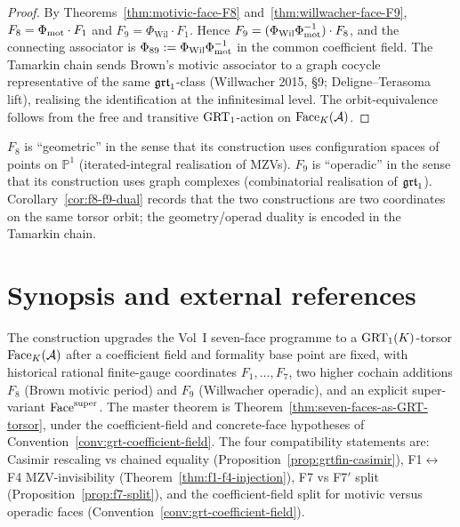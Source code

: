 \begin{proof}
By Theorems~\ref{thm:motivic-face-F8} and~\ref{thm:willwacher-face-F9},
$F_8 = \Phi_{\mathrm{mot}}\cdot F_1$ and $F_9 = \Phi_{\mathrm{Wil}}\cdot F_1$.
Hence
$F_9 = (\Phi_{\mathrm{Wil}}\Phi_{\mathrm{mot}}^{-1})\cdot F_8$, and the
connecting associator is
$\Phi_{89} := \Phi_{\mathrm{Wil}}\Phi_{\mathrm{mot}}^{-1}$ in the common
coefficient field.
The Tamarkin chain sends Brown's motivic associator to a graph
cocycle representative of the same $\mathfrak{grt}_1$-class (Willwacher 2015,
\S9; Deligne--Terasoma lift), realising the identification at the
infinitesimal level. The orbit-equivalence follows from the free
and transitive $\mathrm{GRT}_1$-action on $\mathrm{Face}_K(\mathcal{A})$.
\end{proof}

\begin{remark}
$F_8$ is ``geometric'' in the sense that its construction uses
configuration spaces of points on $\mathbb{P}^1$ (iterated-integral
realisation of MZVs). $F_9$ is ``operadic'' in the sense that its
construction uses graph complexes (combinatorial realisation of
$\mathfrak{grt}_1$). Corollary~\ref{cor:f8-f9-dual} records that the two
constructions are two coordinates on the same torsor orbit; the
geometry/operad duality is encoded in the Tamarkin chain.
\end{remark}

\section{Synopsis and external references}
\label{sec:grt-synopsis}

The construction upgrades the Vol~I seven-face programme to a
$\mathrm{GRT}_1(K)$-torsor $\mathrm{Face}_K(\mathcal{A})$ after a coefficient field and formality
base point are fixed, with historical rational finite-gauge coordinates
$F_1,\dots,F_7$, two higher cochain additions $F_8$ (Brown motivic
period) and $F_9$ (Willwacher operadic), and an explicit super-variant
$\mathrm{Face}^{\mathrm{super}}$. The master theorem is
Theorem~\ref{thm:seven-faces-as-GRT-torsor}, under the
coefficient-field and concrete-face hypotheses of
Convention~\ref{conv:grt-coefficient-field}. The four compatibility
statements are:
Casimir rescaling vs chained equality
(Proposition~\ref{prop:grtfin-casimir}),
F1$\leftrightarrow$F4 MZV-invisibility
(Theorem~\ref{thm:f1-f4-injection}),
F7 vs F7$'$ split (Proposition~\ref{prop:f7-split}),
and the coefficient-field split for motivic versus operadic faces
(Convention~\ref{conv:grt-coefficient-field}).

